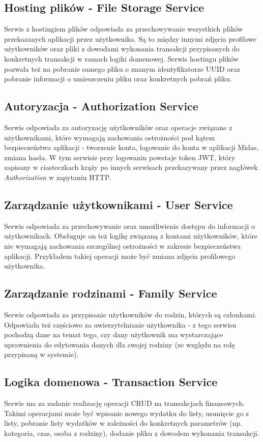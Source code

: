 \documentclass{SGGW-thesis}
\begin{document}
    \subsection{Hosting plików - File Storage Service}
    Serwis z hostingiem plików odpowiada za przechowywanie wszystkich plików przekazanych aplikacji przez użytkownika. Są to między innymi zdjęcia profilowe użytkowników oraz pliki z dowodami wykonania transakcji przypisanych do konkretnych transakcji w ramach logiki domenowej. Serwis hostingu plików pozwala też na pobranie samego pliku o znanym identyfikatorze UUID oraz pobranie informacji o umieszczeniu pliku oraz konkretnych pobrań pliku.
    
    \subsection{Autoryzacja - Authorization Service}
    Serwis odpowiada za autoryzację użytkowników oraz operacje związane z użytkownikami, które wymagają zachowania ostrożności pod kątem bezpieczeństwa aplikacji - tworzenie konta, logowanie do konta w aplikacji Midas, zmiana hasła. W tym serwisie przy logowaniu powstaje token JWT, który zapisany w ciasteczkach krąży po innych serwisach przekazywany przez nagłówek \textit{Authorization} w zapytaniu HTTP. 

    \subsection{Zarządzanie użytkownikami - User Service}
    Serwis odpowiada za przechowywanie oraz umożliwienie dostępu do informacji o użytkownikach. Obsługuje on też logikę związaną z kontami użytkowników, które nie wymagają zachowania szczególnej ostrożności w zakresie bezpieczeństwa aplikacji. Przykładem takiej operacji może być zmiana zdjęcia profilowego użytkownika.

    \subsection{Zarządzanie rodzinami - Family Service}
    Serwis odpowiada za przypisanie użytkowników do rodzin, których są członkami. Odpowiada też częściowo za uwierzytelnianie użytkownika - z tego serwisu pochodzą dane na temat tego, czy dany użytkownik ma wystarczające uprawnienia do edytowania danych dla swojej rodziny (ze względu na rolę przypisaną w systemie).

    \subsection{Logika domenowa - Transaction Service}
    Serwis ma za zadanie realizację operacji CRUD na transakcjach finansowych. Takimi operacjami może być wpisanie nowego wydatku do listy, usunięcie go z listy, pobranie listy wydatków w zależności do konkretnych parametrów (np. kategoria, czas, osoba z rodziny), dodanie pliku z dowodem wykonania transakcji.
\end{document}
